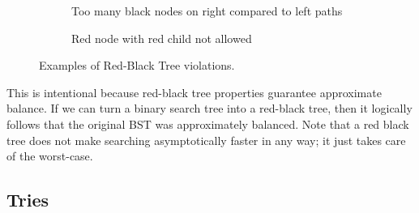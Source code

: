 \begin{figure}[H]
\begin{subfigure}[b]{0.24\textwidth}
      \caption{Too many black nodes on right compared to left paths}
      \label{fig:rb-violation3}
    \end{subfigure}
    \hfill 
    \begin{subfigure}[b]{0.24\textwidth}
    \centering
      \caption{Red node with red child not allowed}
      \label{fig:rb-violation4}
    \end{subfigure}
    \caption{Examples of Red-Black Tree violations.}
    \label{fig:red-black-tree-violations}
  \end{figure}

  This is intentional because red-black tree properties guarantee approximate balance. If we can turn a binary search tree into a red-black tree, then it logically follows that the original BST was approximately balanced. Note that a red black tree does not make searching asymptotically faster in any way; it just takes care of the worst-case. 

\subsection{Tries}

